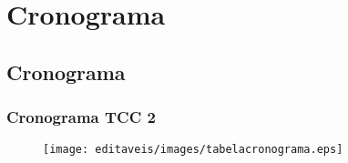 \part{Cronograma}
\chapter[Cronograma]{Cronograma}

\section{Cronograma TCC 2}

    \begin{figure}[ht]
            \centering
            \texttt{[image: editaveis/images/tabelacronograma.eps]}
    \end{figure}